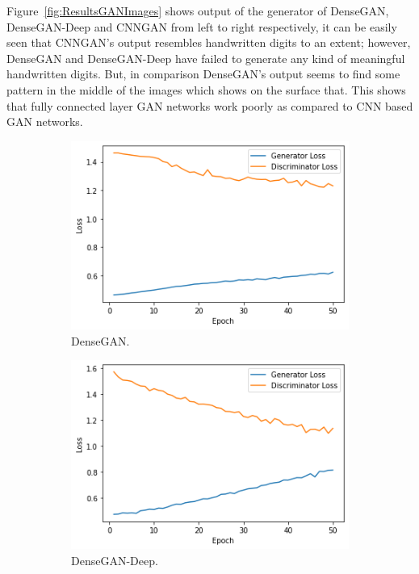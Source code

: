 \documentclass{article}
\begin{document}
	Figure~\ref{fig:ResultsGANImages} shows output of the generator of  DenseGAN, DenseGAN-Deep and CNNGAN from left to right respectively, it can be easily seen that CNNGAN's output resembles handwritten digits to an extent; however, DenseGAN and DenseGAN-Deep have failed to generate any kind of meaningful handwritten digits. But, in comparison DenseGAN's output seems to find some pattern in the middle of the images which shows on the surface that. This shows that fully connected layer GAN networks work poorly as compared to CNN based GAN networks.
	
	\begin{figure}[htbp]
		\centering
		\begin{subfigure}[t]{0.32\textwidth}
			\centering
			\includegraphics[scale=0.33]{GAN_Dense_LossEpoch.png}
			\caption{DenseGAN.}
			\label{fig:GANLoss_1}
		\end{subfigure}
		\begin{subfigure}[t]{0.32\textwidth}
			\centering
			\includegraphics[scale=0.33]{GAN_Dense_LossEpoch_Deep.png}
			\caption{DenseGAN-Deep.}
			\label{fig:GANLoss_2}
		\end{subfigure}
		\begin{subfigure}[t]{0.32\textwidth}

\end{subfigure}
\end{figure}
\end{document}
